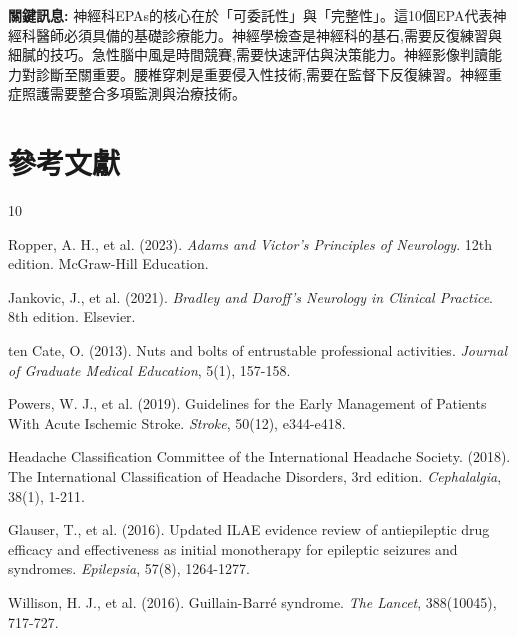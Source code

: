 \documentclass[12pt,a4paper]{article}
\begin{document}
\begin{importantbox}
\textbf{關鍵訊息:} 神經科EPAs的核心在於「可委託性」與「完整性」。這10個EPA代表神經科醫師必須具備的基礎診療能力。神經學檢查是神經科的基石,需要反復練習與細膩的技巧。急性腦中風是時間競賽,需要快速評估與決策能力。神經影像判讀能力對診斷至關重要。腰椎穿刺是重要侵入性技術,需要在監督下反復練習。神經重症照護需要整合多項監測與治療技術。
\end{importantbox}

\section{參考文獻}
\begin{thebibliography}{10}

Ropper, A. H., et al. (2023). \textit{Adams and Victor's Principles of Neurology}. 12th edition. McGraw-Hill Education.

Jankovic, J., et al. (2021). \textit{Bradley and Daroff's Neurology in Clinical Practice}. 8th edition. Elsevier.

ten Cate, O. (2013). Nuts and bolts of entrustable professional activities. \textit{Journal of Graduate Medical Education}, 5(1), 157-158.

Powers, W. J., et al. (2019). Guidelines for the Early Management of Patients With Acute Ischemic Stroke. \textit{Stroke}, 50(12), e344-e418.

Headache Classification Committee of the International Headache Society. (2018). The International Classification of Headache Disorders, 3rd edition. \textit{Cephalalgia}, 38(1), 1-211.

Glauser, T., et al. (2016). Updated ILAE evidence review of antiepileptic drug efficacy and effectiveness as initial monotherapy for epileptic seizures and syndromes. \textit{Epilepsia}, 57(8), 1264-1277.

Willison, H. J., et al. (2016). Guillain-Barré syndrome. \textit{The Lancet}, 388(10045), 717-727.

\end{thebibliography}
\end{document}
